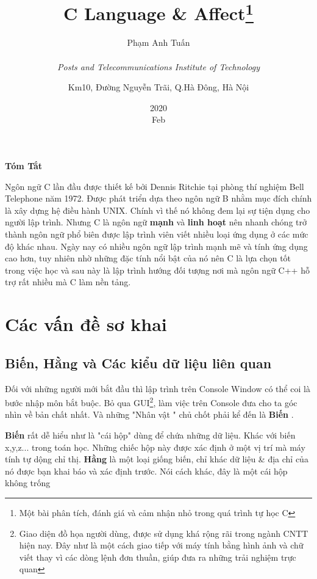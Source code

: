 \documentclass[12pt,a4paper]{article}
\title{\textbf{C Language \& Affect}\thanks{Một bài phân tích, đánh giá và cảm nhận nhỏ trong quá trình tự học C}}
\date{2020\\ Feb}
\author{Phạm Anh Tuấn\\ \\ \textit{Posts and Telecommunications Institute of Technology} \and Km10, Đường Nguyễn Trãi, Q.Hà Đông, Hà Nội}
\begin{document}
\maketitle
\begin{center}
	\textbf{\large Tóm Tắt}
\end{center}


Ngôn ngữ C lần đầu được thiết kế bởi Dennis Ritchie tại phòng thí nghiệm Bell Telephone năm 1972. Được phát triển dựa theo ngôn ngữ B nhằm mục đích chính là xây dựng hệ điều hành UNIX. Chính vì thế nó không đem lại sự tiện dụng cho người lập trình. Nhưng C là ngôn ngữ \textbf{mạnh} và \textbf{linh hoạt} nên nhanh chóng trở thành ngôn ngữ phổ biên được lập trình viên viết nhiều loại ứng dụng ở các mức độ khác nhau. Ngày nay có nhiều ngôn ngữ lập trình mạnh mẽ và tính ứng dụng cao hơn, tuy nhiên nhờ những đặc tính nổi bật của nó nên C là lựa chọn tốt trong việc học và sau này là lập trình hướng đối tượng nơi mà ngôn ngữ C++ hỗ trợ rất nhiều mà C làm nền tảng.
\newpage
\tableofcontents
\newpage
\section{Các vấn đề sơ khai}
\subsection{Biến, Hằng và Các kiểu dữ liệu liên quan }
 Đối với những người mới bắt đầu thì lập trình trên Console Window có thể coi là bước nhập môn bắt buộc. Bỏ qua GUI\footnote{Giao diện đồ họa người dùng, được sử dụng khá rộng rãi trong ngành CNTT hiện nay. Đây như là một cách giao tiếp với máy tính bằng hình ảnh và chữ viết thay vì các dòng lệnh đơn thuần, giúp đưa ra những trải nghiệm trực quan}, làm việc trên Console đưa cho ta góc nhìn về bản chất nhất. Và những "Nhân vật " chủ chốt phải kể đến là \textbf{Biến} . 

\textbf{Biến} rất dễ hiểu như là "cái hộp" dùng để chứa những dữ liệu. Khác với biến x,y,z... trong toán học. Những chiếc hộp này được xác định ở một vị trí mà máy tính tự dộng chỉ thị. \textbf{Hằng} là một loại giống biến, chỉ khác dữ liệu \& địa chỉ của nó được bạn khai báo và xác định trước. Nói cách khác, đây là một cái hộp không trống
\end{document}
